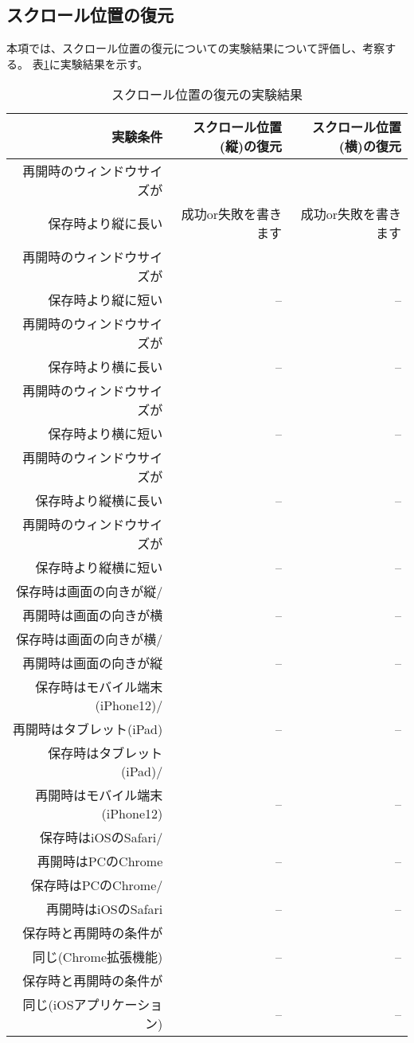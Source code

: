 \subsection{スクロール位置の復元}
本項では、スクロール位置の復元についての実験結果について評価し、考察する。
表\ref{tb:evl-result-scroll-position}に実験結果を示す。

\begin{table}[htbp]
  \caption{スクロール位置の復元の実験結果}
  \label{tb:evl-result-scroll-position}
  \begin{center}
    \begin{tabular}{rrr}
      \hline
      実験条件 & スクロール位置(縦)の復元 & スクロール位置(横)の復元 \\ \hline \hline
      再開時のウィンドウサイズが\\
      保存時より縦に長い & 成功or失敗を書きます & 成功or失敗を書きます \\ \hline
      再開時のウィンドウサイズが\\
      保存時より縦に短い & -- & -- \\ \hline
      再開時のウィンドウサイズが\\
      保存時より横に長い & -- & -- \\ \hline
      再開時のウィンドウサイズが\\
      保存時より横に短い & -- & -- \\ \hline
      再開時のウィンドウサイズが\\
      保存時より縦横に長い & -- & -- \\ \hline
      再開時のウィンドウサイズが\\
      保存時より縦横に短い & -- & -- \\ \hline
      保存時は画面の向きが縦/\\
      再開時は画面の向きが横 & -- & -- \\ \hline
      保存時は画面の向きが横/\\
      再開時は画面の向きが縦 & -- & -- \\ \hline
      保存時はモバイル端末(iPhone12)/\\
      再開時はタブレット(iPad) & -- & -- \\ \hline
      保存時はタブレット(iPad)/\\
      再開時はモバイル端末(iPhone12) & -- & -- \\ \hline
      保存時はiOSのSafari/\\
      再開時はPCのChrome & -- & -- \\ \hline
      保存時はPCのChrome/\\
      再開時はiOSのSafari & -- & -- \\ \hline
      保存時と再開時の条件が\\
      同じ(Chrome拡張機能) & -- & -- \\ \hline
      保存時と再開時の条件が\\
      同じ(iOSアプリケーション) & -- & -- \\ \hline
    \end{tabular}
  \end{center}
\end{table}
